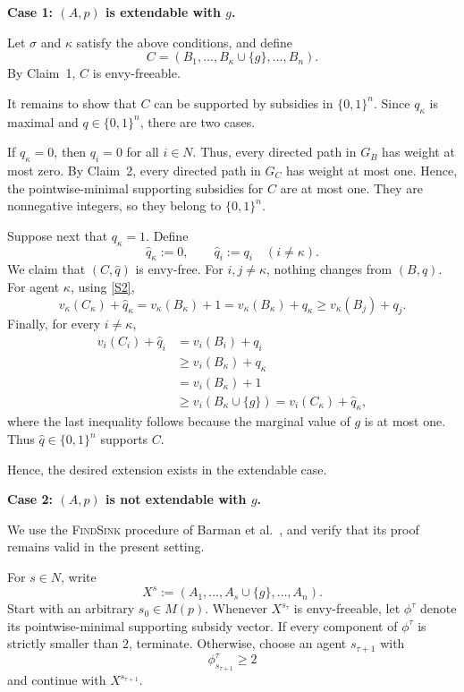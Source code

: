 \documentclass[11pt]{article}
\makeatletter
\theoremstyle{plain}
\theoremstyle{plain}
\renewenvironment{proof}[1][\proofname]{\par
  \pushQED{\qed}%
  \normalfont \topsep6\p@\@plus6\p@\relax
  \trivlist
  \item[\hskip\labelsep\bfseries #1\@addpunct{}]\ignorespaces
}{%
  \popQED\endtrivlist\@endpefalse
}
\makeatother
\begin{document}
\begin{proof}
\medskip
\noindent
\textbf{Case 1: $(A,p)$ is extendable with $g$.}

Let $\sigma$ and $\kappa$ satisfy the above conditions, and define
\[
C=(B_1,\ldots,B_\kappa\cup\{g\},\ldots,B_n).
\]
By Claim~1, $C$ is envy-freeable.

It remains to show that $C$ can be supported by subsidies in $\{0,1\}^n$. Since $q_\kappa$ is maximal and
$q\in\{0,1\}^n$, there are two cases.

If $q_\kappa=0$, then $q_i=0$ for all $i\in N$. Thus, every directed path in $G_B$ has weight at most zero. By Claim~2, every directed path in $G_C$ has weight at most one. Hence, the pointwise-minimal supporting subsidies for $C$ are at most one. They are nonnegative integers, so they belong to $\{0,1\}^n$.

Suppose next that $q_\kappa=1$. Define
\[
\widehat q_\kappa:=0,
\qquad
\widehat q_i:=q_i
\quad (i\neq\kappa).
\]
We claim that $(C,\widehat q)$ is envy-free. For $i,j\neq\kappa$, nothing changes from $(B,q)$. For agent
$\kappa$, using \eqref{S2},
\[
v_\kappa(C_\kappa)+\widehat q_\kappa
=
v_\kappa(B_\kappa)+1
=
v_\kappa(B_\kappa)+q_\kappa
\geq
v_\kappa(B_j)+q_j.
\]
Finally, for every $i\neq\kappa$,
\[
\begin{aligned}
v_i(C_i)+\widehat q_i
&=v_i(B_i)+q_i\\
&\geq v_i(B_\kappa)+q_\kappa\\
&=v_i(B_\kappa)+1\\
&\geq v_i(B_\kappa\cup\{g\})
 =v_i(C_\kappa)+\widehat q_\kappa,
\end{aligned}
\]
where the last inequality follows because the marginal value of $g$ is at most one. Thus $\widehat q\in\{0,1\}^n$ supports $C$.

Hence, the desired extension exists in the extendable case.

\medskip
\noindent
\textbf{Case 2: $(A,p)$ is not extendable with $g$.}

We use the \textsc{FindSink} procedure of Barman et al.~\cite{BKNS22}, and verify that its proof remains valid in the
present setting.

For $s\in N$, write
\[
X^s:=(A_1,\ldots,A_s\cup\{g\},\ldots,A_n).
\]
Start with an arbitrary $s_0\in M(p)$. Whenever $X^{s_\tau}$ is envy-freeable, let $\phi^\tau$ denote its pointwise-minimal supporting subsidy vector. If every component of $\phi^\tau$ is strictly smaller than $2$, terminate. Otherwise, choose an agent
$s_{\tau+1}$ with
\[
\phi^\tau_{s_{\tau+1}}\geq2
\]
and continue with $X^{s_{\tau+1}}$.


\end{proof}
\end{document}
